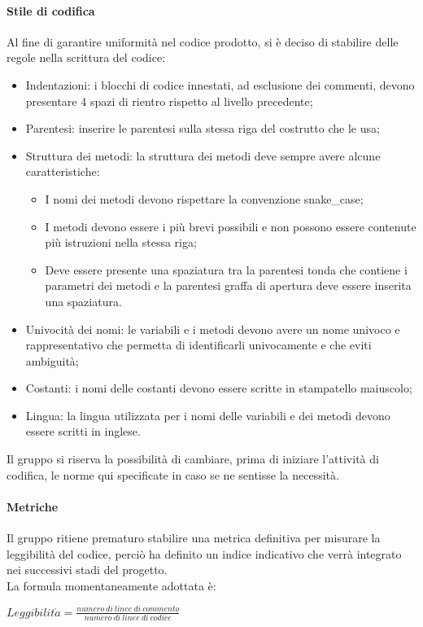 \documentclass[../norme_di_progetto.tex]{subfiles}
\begin{document}
    \paragraph{Stile di codifica}
    Al fine di garantire uniformità nel codice prodotto, si è deciso di stabilire delle regole nella scrittura del codice:
    \begin{itemize}
        \item Indentazioni: i blocchi di codice innestati, ad esclusione dei commenti, devono presentare 4 spazi di rientro rispetto al livello precedente;
        \item Parentesi: inserire le parentesi sulla stessa riga del costrutto che le usa;
        \item Struttura dei metodi: la struttura dei metodi deve sempre avere alcune caratteristiche:
        \begin{itemize}
            \item I nomi dei metodi devono rispettare la convenzione snake\_case;
            \item I metodi devono essere i più brevi possibili e non possono essere contenute più istruzioni nella stessa riga;
            \item Deve essere presente una spaziatura tra la parentesi tonda che contiene i parametri dei metodi e la parentesi graffa di apertura deve essere inserita una spaziatura.
        \end{itemize}
        \item Univocità dei nomi: le variabili e i metodi devono avere un nome univoco e rappresentativo che permetta di identificarli univocamente e che eviti ambiguità;
        \item Costanti: i nomi delle costanti devono essere scritte in stampatello maiuscolo;
        \item Lingua: la lingua utilizzata per i nomi delle variabili e dei metodi devono essere scritti in inglese.
    \end{itemize}
    Il gruppo si riserva la possibilità di cambiare, prima di iniziare l'attività di codifica, le norme qui specificate in caso se ne sentisse la necessità.

    \paragraph{Metriche}
    Il gruppo ritiene prematuro stabilire una metrica definitiva per misurare la leggibilità del codice, perciò ha definito un indice indicativo che verrà integrato nei successivi stadi del progetto.\\
    La formula momentaneamente adottata è:
    \begin{center}
        $Leggibilit\grave{a} = \frac{numero\ di\ linee\ di\ commento}{numero\ di\ linee\ di\ codice}$
    \end{center}
\end{document}

